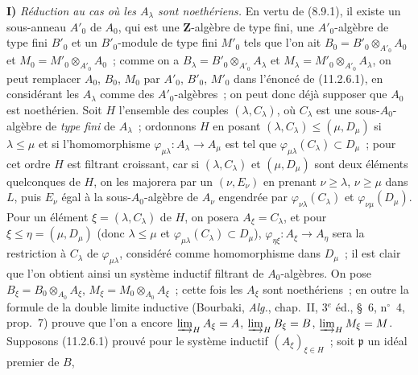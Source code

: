 \medskip
\noindent\textbf{I)} \emph{Réduction au cas où les $A_\lambda$ sont
noethériens.} En vertu de (8.9.1), il existe un sous-anneau $A'_0$ de $A_0$,
qui est une $\mathbf Z$-algèbre de type fini, une $A'_0$-algèbre de type fini
$B'_0$ et un $B'_0$-module de type fini $M'_0$ tels que l'on ait
$B_0=B'_0\otimes_{A'_0}A_0$ et $M_0=M'_0\otimes_{A'_0}A_0$~; comme on a
$B_\lambda=B'_0\otimes_{A'_0}A_\lambda$ et
$M_\lambda=M'_0\otimes_{A'_0}A_\lambda$, on peut remplacer $A_0$, $B_0$,
$M_0$ par $A'_0$, $B'_0$, $M'_0$ dans l'énoncé de (11.2.6.1), en considérant
les $A_\lambda$ comme des $A'_0$-algèbres~; on peut donc déjà supposer que
$A_0$ est noethérien. Soit $H$ l'ensemble des couples
$(\lambda,C_\lambda)$, où $C_\lambda$ est une sous-$A_0$-algèbre de
\emph{type fini} de $A_\lambda$~; ordonnons $H$ en posant
$(\lambda,C_\lambda)\leq(\mu,D_\mu)$ si $\lambda\leq\mu$ et si
l'homomorphisme $\varphi_{\mu\lambda}:A_\lambda\to A_\mu$ est tel que
$\varphi_{\mu\lambda}(C_\lambda)\subset D_\mu$~; pour cet ordre $H$ est
filtrant croissant, car si $(\lambda,C_\lambda)$ et $(\mu,D_\mu)$ sont deux
éléments quelconques de $H$, on les majorera par un $(\nu,E_\nu)$ en prenant
$\nu\geq\lambda$, $\nu\geq\mu$ dans $L$, puis $E_\nu$ égal à la
sous-$A_0$-algèbre de $A_\nu$ engendrée par
$\varphi_{\nu\lambda}(C_\lambda)$ et $\varphi_{\nu\mu}(D_\mu)$. Pour un
élément $\xi=(\lambda,C_\lambda)$ de $H$, on posera $A_\xi=C_\lambda$, et
pour $\xi\leq\eta=(\mu,D_\mu)$ (donc $\lambda\leq\mu$ et
$\varphi_{\mu\lambda}(C_\lambda)\subset D_\mu$),
$\varphi_{\eta\xi}:A_\xi\to A_\eta$ sera la restriction à $C_\lambda$ de
$\varphi_{\mu\lambda}$, considéré comme homomorphisme dans $D_\mu$~; il est
clair que l'on obtient ainsi un système inductif filtrant de $A_0$-algèbres.
On pose $B_\xi=B_0\otimes_{A_0}A_\xi$,
$M_\xi=M_0\otimes_{A_0}A_\xi$~; cette fois les $A_\xi$ sont
noethériens~; en outre la formule de la double limite inductive (Bourbaki,
\emph{Alg.}, chap.~II, 3$^e$ éd., \S~6, n$^\circ$~4, prop.~7) prouve que
l'on a encore
$\varinjlim_HA_\xi=A$, $\varinjlim_HB_\xi=B$,
$\varinjlim_HM_\xi=M$. Supposons (11.2.6.1) prouvé pour le système inductif
$(A_\xi)_{\xi\in H}$~; soit $\mathfrak p$ un idéal premier de $B$,


